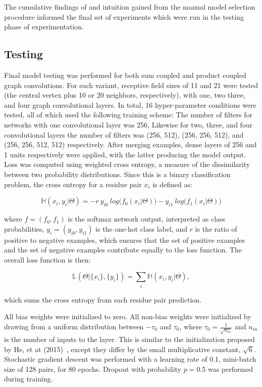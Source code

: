 The cumulative findings of and intuition gained from the manual model selection procedure informed the final set of experiments which were run in the testing phase of experimentation.

\subsection{Testing}

Final model testing was performed for both sum coupled and product coupled graph convolutions.
For each variant, receptive field sizes of 11 and 21 were tested (the central vertex plus 10 or 20 neighbors, respectively), with one, two three, and four graph convolutional layers. 
In total, 16 hyper-parameter conditions were tested, all of which used the following training scheme:
The number of filters for networks with one convolutional layer was 256, Likewise for two, three, and four convolutional layers the number of filters was (256, 512), (256, 256, 512), and (256, 256, 512, 512) respectively. 
After merging examples, dense layers of 256 and 1 units respectively were applied, with the latter producing the model output.
Loss was computed using weighted cross entropy, a measure of the dissimilarity between two probability distributions. 
Since this is a binary classification problem, the cross entropy for a residue pair $x_i$ is defined as: 

\begin{equation}
\mathbb{H}(x_i, y_i | \Theta) = - r ~ y_{i0} ~ log\big(f_0(x_i|\Theta)\big) - y_{i1} ~ log\big(f_1(x_i|\Theta)\big)
\label{eq:weighted_ce}
\end{equation}

\noindent
where $f = (f_0, f_1)$ is the softmax network output, interpreted as class probabilities, $y_i = (y_{i0}, y_{i1})$ is the one-hot class label, and $r$ is the ratio of positive to negative examples, which ensures that the set of positive examples and the set of negative examples contribute equally to the loss function.
The overall loss function is then:

\begin{equation}
\mathbb{L}(\Theta | \{x_i\}, \{y_i\}) = \sum_{i} \mathbb{H}(x_i, y_i | \Theta),
\end{equation}

\noindent
which sums the cross entropy from each residue pair prediction.


All bias weights were initialized to zero.
All non-bias weights were initialized by drawing from a uniform distribution between $-\tau_0$ and $\tau_0$, where $\tau_0=\frac{1}{\sqrt{n_{in}}}$ and $n_{in}$ is the number of inputs to the layer.
This is similar to the initialization proposed by He, et at (2015)~\cite{he2015}, except they differ by the small multiplicative constant, $\sqrt{6}$.
Stochastic gradient descent was performed with a learning rate of 0.1, mini-batch size of 128 pairs, for 80 epochs. 
Dropout with probability $p=0.5$ was performed during training.

